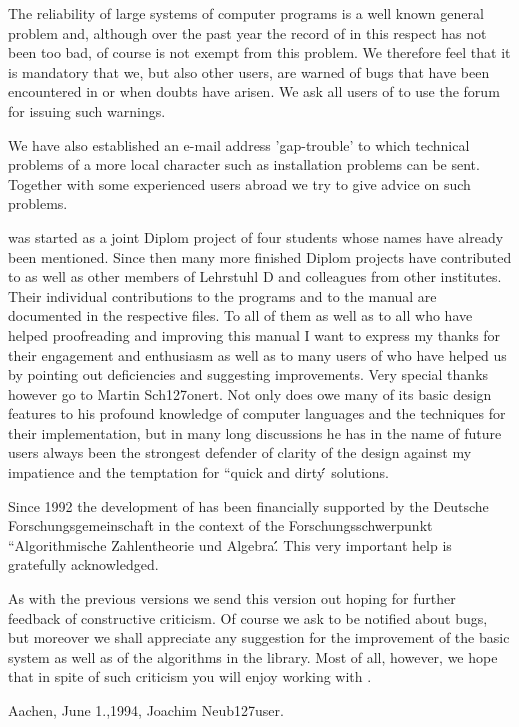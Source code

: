 The reliability of  large systems  of  computer programs is  a well known
general problem and, although over the past year the  record of {\GAP} in
this respect has not been too  bad, of  course  {\GAP} is not exempt from
this problem.  We therefore feel that it is mandatory  that  we, but also
other users, are warned of bugs that  have been encountered in  {\GAP} or
when doubts have arisen.  We  ask all users of {\GAP} to  use  the {\GAP}
forum for issuing such warnings.

We   have  also established  an e-mail    address  'gap-trouble' to which
technical  problems   of a  more local   character  such as  installation
problems can be sent. Together  with some experienced {\GAP} users abroad
we try to give advice on such problems.

{\GAP} was started as a joint Diplom project of four students whose names
have  already  been  mentioned.   Since then many   more finished  Diplom
projects have contributed to {\GAP} as well as other members of Lehrstuhl
D  and colleagues from other  institutes.  Their individual contributions
to the programs and to the manual are documented in the respective files.
To all of   them as well    as to all who  have   helped proofreading and
improving this manual  I want to express  my thanks for their  engagement
and enthusiasm as well as to many users  of {\GAP} who  have helped us by
pointing out   deficiencies and  suggesting improvements.   Very  special
thanks however go to  Martin Sch{\accent127o}nert.  Not only  does {\GAP}
owe many  of  its  basic design  features  to his  profound  knowledge of
computer languages  and the techniques for  their  implementation, but in
many long discussions he has in the name of  future users always been the
strongest defender of clarity of the design against my impatience and the
temptation for ``quick and dirty\'\'\, solutions.

Since  1992 the development of  {\GAP}  has been financially supported by
the Deutsche     Forschungsgemeinschaft    in  the   context      of  the
Forschungsschwerpunkt  ``Algorithmische Zahlentheorie   und  Algebra\'\'.
This very important help is gratefully acknowledged.

As with the previous versions we send this version out hoping for further
feedback of constructive   criticism.  Of course  we ask  to be  notified
about bugs,  but moreover  we shall  appreciate   any suggestion  for the
improvement of the  basic  system as  well  as of  the algorithms  in the
library.  Most of all,  however, we hope that in  spite of such criticism
you will enjoy working with {\GAP}.

Aachen, June 1.,1994, \hfill Joachim Neub{\accent127u}ser.



